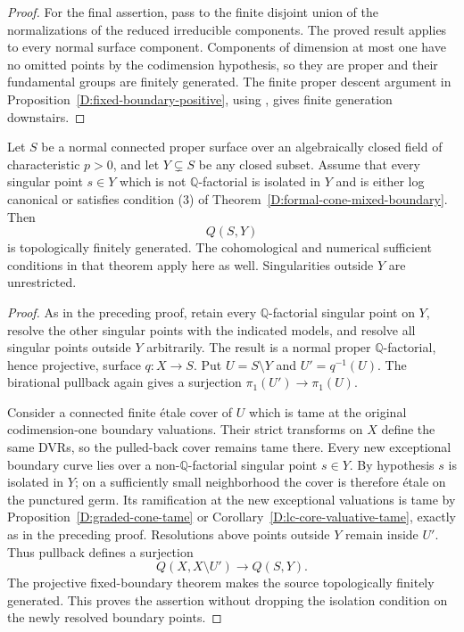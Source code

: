 \begin{proof}
For the final assertion, pass to the finite disjoint union
of the normalizations of the reduced irreducible components.
The proved result applies to every normal surface component.
Components of dimension at most one have no omitted points
by the codimension hypothesis, so they are proper and their
fundamental groups are finitely generated.  The finite proper
descent argument in Proposition~\ref{D:fixed-boundary-positive},
using \cite[IX, Corollary 5.2]{SGA1}, gives finite generation
downstairs.
\end{proof}

\begin{corollary}
\label{D:formal-cone-fixed-boundary}
Let $S$ be a normal connected proper surface over an algebraically
closed field of characteristic $p>0$, and let $Y\subsetneq S$
be any closed subset.  Assume that every singular point
$s\in Y$ which is not $\mathbb Q$-factorial is isolated in
$Y$ and is either log canonical or satisfies condition (3)
of Theorem~\ref{D:formal-cone-mixed-boundary}.  Then
\[
                         Q(S,Y)
\]
is topologically finitely generated.  The cohomological and
numerical sufficient conditions in that theorem apply here
as well.  Singularities outside $Y$ are unrestricted.
\end{corollary}
\begin{proof}
As in the preceding proof, retain every $\mathbb Q$-factorial
singular point on $Y$, resolve the other singular points with
the indicated models, and resolve all singular points outside
$Y$ arbitrarily.  The result is a normal proper
$\mathbb Q$-factorial, hence projective, surface $q:X\to S$.
Put $U=S\setminus Y$ and $U'=q^{-1}(U)$.  The birational
pullback again gives a surjection $\pi_1(U')\to\pi_1(U)$.

Consider a connected finite \'etale cover of $U$ which is
tame at the original codimension-one boundary valuations.
Their strict transforms on $X$ define the same DVRs, so the
pulled-back cover remains tame there.  Every new exceptional
boundary curve lies over a non-$\mathbb Q$-factorial singular
point $s\in Y$.  By hypothesis $s$ is isolated in $Y$; on a
sufficiently small neighborhood the cover is therefore
\'etale on the punctured germ.  Its ramification at the new
exceptional valuations is tame by
Proposition~\ref{D:graded-cone-tame} or
Corollary~\ref{D:lc-core-valuative-tame}, exactly as in the preceding
proof.  Resolutions above points outside $Y$ remain inside
$U'$.  Thus pullback defines a surjection
\[
                         Q(X,X\setminus U')\longrightarrow Q(S,Y).
\]
The projective fixed-boundary theorem makes the source
topologically finitely generated.  This proves the assertion
without dropping the isolation condition on the newly
resolved boundary points.
\end{proof}
